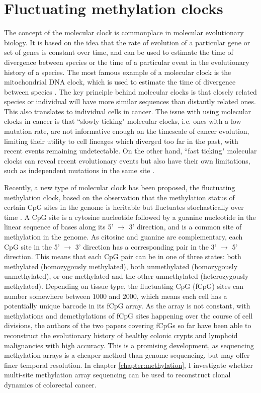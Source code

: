 \section{Fluctuating methylation clocks}
The concept of the molecular clock is commonplace in molecular evolutionary biology. It is based on the idea that the
rate of evolution of a particular gene or set of genes is constant over time, and can be used to estimate
the time of divergence between species or the time of a particular event in the evolutionary history of a
species. The most famous example of a molecular clock is the mitochondrial DNA clock, which is used to
estimate the time of divergence between species \cite{hasegawa_dating_1985}. The key principle behind molecular
clocks is that closely related species or individual will have more similar sequences than distantly related
ones. This also translates to individual cells in cancer. The issue with using molecular clocks in cancer
is that ``slowly ticking" molecular clocks, i.e. ones with a low mutation rate, are not informative enough
on the timescale of cancer evolution, limiting their utility to cell lineages which diverged too far in the past,
with recent events remaining undetectable. On the other hand, ``fast ticking" molecular clocks can
reveal recent evolutionary events but also have their own limitations, such as independent mutations in the
same site \cite{kuipers_single-cell_2017}. \par
Recently, a new type of molecular clock has been proposed, the fluctuating methylation clock, based on the
observation that the methylation status of certain CpG sites in the genome is heritable but fluctuates
stochastically over time \cite{gabbutt_fluctuating_2022, gabbutt_evolutionary_2023}. A CpG site is a
cytosine nucleotide followed by a guanine nucleotide in the linear sequence of bases along its
5' $\rightarrow$ 3' direction, and is a common site of methylation in the genome. As citosine and guanine
are complementary, each CpG site in the 5' $\rightarrow$ 3' direction has a corresponding pair in the
3' $\rightarrow$ 5' direction. This means that each CpG pair can be in one of three states: both
methylated (homozygously methylated), both unmethylated (homozygously unmethylated), or one methylated
and the other unmethylated (heterozygously methylated). Depending on tissue type, the fluctuating CpG
(fCpG) sites can number somewhere between $1000$ and $2000$, which means each cell has a potentially
unique barcode in its fCpG array. As the array is not constant, with methylations and demethylations
of fCpG sites happening over the course of cell divisions, the authors of the two papers covering fCpGs
so far have been able to reconstruct the evolutionary history of healthy colonic crypts and lymphoid
malignancies with high accuracy. This is a promising development, as sequencing methylation arrays
is a cheaper method than genome sequencing, but may offer finer temporal resolution. In chapter
\ref{chapter:methylation}, I investigate whether multi-site methylation array sequencing can be used
to reconstruct clonal dynamics of colorectal cancer.


